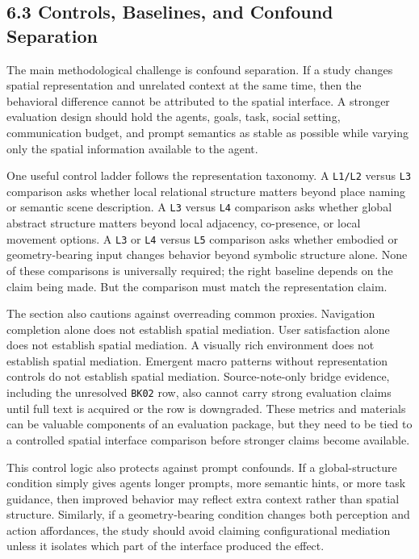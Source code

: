 \documentclass[
  twocolumn]{article}
\begin{document}
\subsection{6.3 Controls, Baselines, and Confound
Separation}\label{controls-baselines-and-confound-separation}

The main methodological challenge is confound separation. If a study
changes spatial representation and unrelated context at the same time,
then the behavioral difference cannot be attributed to the spatial
interface. A stronger evaluation design should hold the agents, goals,
task, social setting, communication budget, and prompt semantics as
stable as possible while varying only the spatial information available
to the agent.

One useful control ladder follows the representation taxonomy. A
\texttt{L1/L2} versus \texttt{L3} comparison asks whether local
relational structure matters beyond place naming or semantic scene
description. A \texttt{L3} versus \texttt{L4} comparison asks whether
global abstract structure matters beyond local adjacency, co-presence,
or local movement options. A \texttt{L3} or \texttt{L4} versus
\texttt{L5} comparison asks whether embodied or geometry-bearing input
changes behavior beyond symbolic structure alone. None of these
comparisons is universally required; the right baseline depends on the
claim being made. But the comparison must match the representation
claim.

The section also cautions against overreading common proxies. Navigation
completion alone does not establish spatial mediation. User satisfaction
alone does not establish spatial mediation. A visually rich environment
does not establish spatial mediation. Emergent macro patterns without
representation controls do not establish spatial mediation.
Source-note-only bridge evidence, including the unresolved \texttt{BK02}
row, also cannot carry strong evaluation claims until full text is
acquired or the row is downgraded. These metrics and materials can be
valuable components of an evaluation package, but they need to be tied
to a controlled spatial interface comparison before stronger claims
become available.

This control logic also protects against prompt confounds. If a
global-structure condition simply gives agents longer prompts, more
semantic hints, or more task guidance, then improved behavior may
reflect extra context rather than spatial structure. Similarly, if a
geometry-bearing condition changes both perception and action
affordances, the study should avoid claiming configurational mediation
unless it isolates which part of the interface produced the effect.
\end{document}

